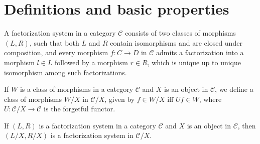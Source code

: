 %

\section{Definitions and basic properties}

\begin{definition}
  A factorization system in a category $\mathcal{C}$ consists of two classes of morphisms $(L,R)$, such that both $L$ and $R$ contain isomorphisms and are closed under composition, and every morphism $f: C \to D$ in $\mathcal{C}$ admits a factorization into a morphism $l\in L$ followed by a morphism $r\in R$, which is unique up to unique isomorphism among such factorizations.
  \begin{center}
\end{center}
\end{definition}

\begin{definition}
  If $W$ is a class of morphisms in a category $\mathcal{C}$ and $X$ is an object in $\mathcal{C}$, we define a class of morphisms $W/X$ in $\mathcal{C}/X$, given by $f \in W/X$ iff $U f \in W$, where $U : \mathcal{C}/X \to \mathcal{C}$ is the forgetful functor.
\end{definition}

\begin{lemma}
  If $(L,R)$ is a factorization system in a category $\mathcal{C}$ and $X$ is an object in $\mathcal{C}$, then $(L/X,R/X)$ is a factorization system in $\mathcal{C}/X$.
\end{lemma}

